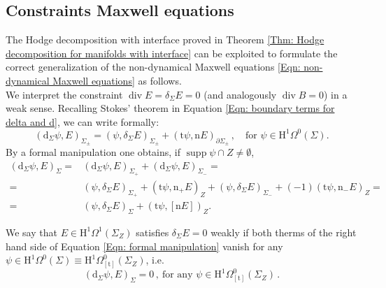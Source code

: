 \subsection{Constraints Maxwell equations}\label{Rmk: Hodge formulation of non-dynamical Maxwell equations}
	The Hodge decomposition with interface proved in Theorem \ref{Thm: Hodge decomposition for manifolds with interface} can be exploited to formulate the correct generalization of the non-dynamical Maxwell equations \eqref{Eqn: non-dynamical Maxwell equations} as follows.\\
	We interpret the constraint $\operatorname{div} E=\delta_\Sigma E=0$ (and analogously $\operatorname{div} B=0$) in a weak sense. Recalling Stokes' theorem in Equation \ref{Eqn: boundary terms for delta and d}, we can write formally:
	\begin{equation}
		(\mathrm{d}_\Sigma\psi,E)_{\Sigma_\pm}=(\psi,\delta_\Sigma E)_{\Sigma_\pm}+
		(\mathrm{t}\psi,\mathrm{n}E)_{\partial\Sigma_\pm}\,,\quad \text{for } \psi\in\mathrm{H}^1\Omega^0(\Sigma).
	\end{equation}
	By a formal manipulation one obtains, if $\operatorname{supp}\psi \cap Z\neq\emptyset$,
	\begin{align}\label{Eqn: formal manipulation}
		\nonumber(\mathrm{d}_\Sigma\psi,E)_{\Sigma}=&(\mathrm{d}_\Sigma\psi,E)_{\Sigma_+}+(\mathrm{d}_\Sigma\psi,E)_{\Sigma_-}=\\ =&(\psi,\delta_\Sigma E)_{\Sigma_+}+		(\mathrm{t}\psi,\mathrm{n}_+E)_Z+(\psi,\delta_\Sigma E)_{\Sigma_-}+
		(-1)(\mathrm{t}\psi,\mathrm{n}_-E)_Z=\\
		\nonumber=&(\psi,\delta_\Sigma E)_\Sigma+(\mathrm{t}\psi,[\mathrm{n}E])_Z.
	\end{align}
	
	\begin{Definition}
		We say that $E\in \mathrm{H}^1\Omega^1(\Sigma_Z)$ satisfies $\delta_\Sigma E=0$ weakly if both therms of the right hand side of Equation \eqref{Eqn: formal manipulation} vanish for any $\psi\in \mathrm{H}^1\Omega^0(\Sigma)\equiv\mathrm{H}^1\Omega^0_{[\mathrm{t}]}(\Sigma_Z)$, i.e.
		\begin{equation}
			(\mathrm{d}_\Sigma\psi,E)_{\Sigma}=0\,,\ \text{for any } \psi\in \mathrm{H}^1\Omega^0_{[\mathrm{t}]}(\Sigma_Z)\,.
		\end{equation}
		
	\end{Definition}
	
